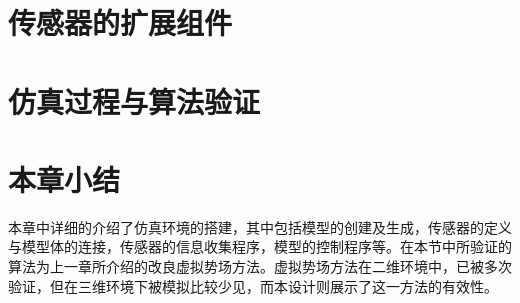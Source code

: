 \section{传感器的扩展组件}
\section{仿真过程与算法验证}

\section{本章小结}
本章中详细的介绍了仿真环境的搭建，其中包括模型的创建及生成，传感器的定义与模型体的连接，传感器的信息收集程序，模型的控制程序等。在本节中所验证的算法为上一章所介绍的改良虚拟势场方法。虚拟势场方法在二维环境中，已被多次验证，但在三维环境下被模拟比较少见，而本设计则展示了这一方法的有效性。